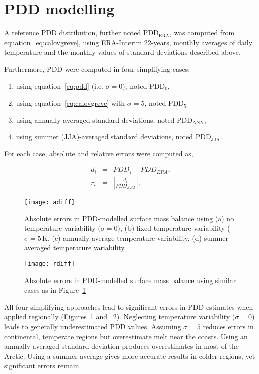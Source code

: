 \documentclass[twocolumn]{igs}
\begin{document}

\section{PDD modelling}

A reference PDD distribution, further noted $\mathrm{PDD_{ERA}}$, was computed from equation~\ref{eq:calovgreve}, using ERA-Interim 22-years, monthly averages of daily temperature and the monthly values of standard deviations described above.

Furthermore, PDD were computed in four simplifying cases:

\begin{enumerate}
  \item using equation~\ref{eq:pdd} (i.e. $\sigma=0$), noted $\mathrm{PDD_{0}}$,
  \item using equation~\ref{eq:calovgreve} with $\sigma=5$, noted $\mathrm{PDD_{5}}$
  \item using annually-averaged standard deviations, noted $\mathrm{PDD_{ANN}}$,
  \item using summer (JJA)-averaged standard deviations, noted $\mathrm{PDD_{JJA}}$.
\end{enumerate}

For each case, absolute and relative errors were computed as,

\begin{eqnarray}
  d_i &=& PDD_i - PDD_{ERA}, \\
  r_i &=& \left|\frac{d_i}{PDD_{ERA}}\right|.
\end{eqnarray}

\begin{figure}
  \centering\texttt{[image: adiff]}
  \caption{Absolute errors in PDD-modelled surface mass balance using (a) no temperature variability ($\sigma=0$), (b) fixed temperature variability ($\sigma=5\,\mathrm{K}$, (c) annually-average temperature variability, (d) summer-averaged temperature variability.}
  \label{fig:adiff}
\end{figure}

\begin{figure}
  \centering\texttt{[image: rdiff]}
  \caption{Absolute errors in PDD-modelled surface mass balance using similar cases as in Figure~\ref{fig:adiff}}
  \label{fig:rdiff}
\end{figure}

All four simplifying approaches lead to significant errors in PDD estimates when applied regionally (Figures~\ref{fig:adiff} and ~\ref{fig:rdiff}). Neglecting temperature variability ($\sigma=0$) leads to generally underestimated PDD values. Assuming $\sigma=5$ reduces errors in continental, temperate regions but overestimate melt near the coasts. Using an annually-averaged standard deviation produces overestimates in most of the Arctic. Using a summer average gives more accurate results in colder regions, yet significant errors remain.
\end{document}
